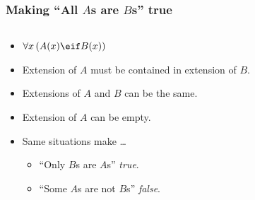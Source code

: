 \begin{frame}
\frametitle{Making ``All $A$s are $B$s'' true}

\begin{columns}
  \begin{column}{.5\textwidth}
    \begin{itemize}
      \item $\forall x\,(A(x) \eif B(x))$
      \item Extension of $A$ must be contained in extension of $B$.
      \item Extensions of $A$ and $B$ can be the same.
      \item Extension of $A$ can be empty.
      \item Same situations make \dots
      \begin{itemize}
        \item ``Only $B$s are $A$s'' \emph{true}.
        \item ``Some $A$s are not $B$s'' \emph{false}.
      \end{itemize}
    \end{itemize}
  \end{column}
  \begin{column}{.5\textwidth}
\end{column}
\end{columns}
\end{frame}

